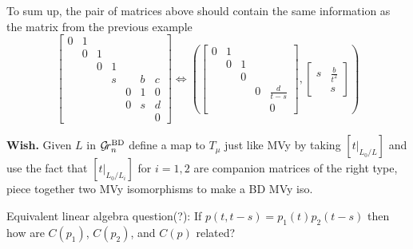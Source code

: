 \documentclass{article}
\begin{document}
\begin{example}
    To sum up, the pair of matrices above should contain the same information as the matrix from the previous example 
    \[
    \begin{bmatrix}
    0 & 1 \\
      & 0 & 1 \\
      &   & 0 & 1 \\
      &   &   & s &  & b & c \\
      &   &   &   & 0 & 1 & 0 \\
      &   &   &   & 0 & s & d \\
      &   &   &   &   &   & 0
    \end{bmatrix} \Leftrightarrow \left( \begin{bmatrix}
            0 & 1\\
              & 0 & 1\\
              &   & 0 &  &  \\
              & & & 0 & \frac d {t-s} \\
              & & & & 0  
        \end{bmatrix} , \begin{bmatrix}
        s & \frac b {t^2} \\ & s 
        \end{bmatrix}\right) 
    \] 
\end{example}

{\bf Wish.} Given $L$ in ${\mathcal G\!r^{\text{BD}}_{n}}$ define a map to $T_\mu$ just like MVy by taking $[t\big|_{L_0/L}]$ and use the fact that $[t\big|_{L_0/L_i}]$ for $i = 1,2$ are companion matrices of the right type, piece together two MVy isomorphisms to make a BD MVy iso. 

Equivalent linear algebra question(?): If $p(t,t-s) = p_1(t)p_2(t-s)$ then how are $C(p_1)$, $C(p_2)$, and $C(p)$ related? 
\newpage
\end{document}
